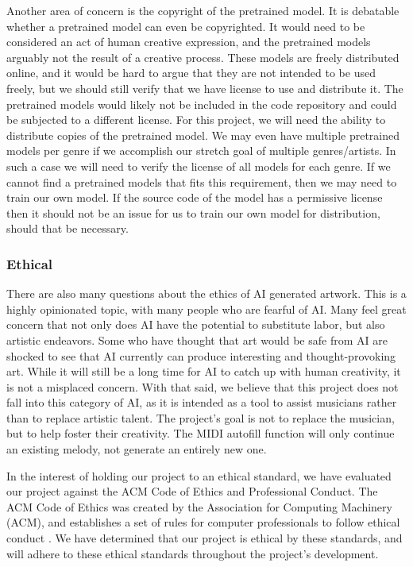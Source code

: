 Another area of concern is the copyright of the pretrained model. It is debatable whether
a pretrained model can even be copyrighted. It would need to be considered an act of
human creative expression, and the pretrained models arguably not the result of a creative
process. These models are freely distributed online, and it would be hard to argue that
they are not intended to be used freely, but we should still verify that we have license
to use and distribute it. The pretrained models would likely not be included in the code
repository and could be subjected to a different license. For this project, we will need
the ability to distribute copies of the pretrained model. We may even have multiple
pretrained models per genre if we accomplish our stretch goal of multiple genres/artists.
In such a case we will need to verify the license of all models for each genre. If we
cannot find a pretrained models that fits this requirement, then we may need to train our
own model. If the source code of the model has a permissive license then it should not be
an issue for us to train our own model for distribution, should that be necessary.

\subsubsection{Ethical}

There are also many questions about the ethics of AI generated artwork. This is a highly
opinionated topic, with many people who are fearful of AI. Many feel great concern that
not only does AI have the potential to substitute labor, but also artistic endeavors. Some
who have thought that art would be safe from AI are shocked to see that AI currently can
produce interesting and thought-provoking art. While it will still be a long time for AI
to catch up with human creativity, it is not a misplaced concern. With that said, we
believe that this project does not fall into this category of AI, as it is intended as a
tool to assist musicians rather than to replace artistic talent. The project’s goal is not
to replace the musician, but to help foster their creativity. The MIDI autofill function
will only continue an existing melody, not generate an entirely new one.

In the interest of holding our project to an ethical standard, we have evaluated our
project against the ACM Code of Ethics and Professional Conduct. The ACM Code of Ethics
was created by the Association for Computing Machinery (ACM), and establishes a set of
rules for computer professionals to follow ethical conduct \autocite{acm-code-of-ethics}.
We have determined that our project is ethical by these standards, and will adhere to
these ethical standards throughout the project's development.

